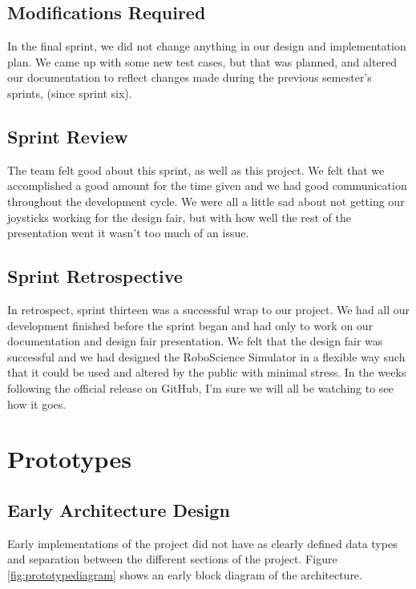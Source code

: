 \subsection{Modifications Required}
In the final sprint, we did not change anything in our design and implementation plan. We came up with some new test cases, but that was planned, and altered our documentation to reflect changes made during the previous semester's sprints, (since sprint six).

\subsection{Sprint Review}
The team felt good about this sprint, as well as this project. We felt that we accomplished a good amount for the time given and we had good communication throughout the development cycle. We were all a little sad about not getting our joysticks working for the design fair, but with how well the rest of the presentation went it wasn't too much of an issue.

\subsection{Sprint Retrospective}
In retrospect, sprint thirteen was a successful wrap to our project. We had all our development finished before the sprint began and had only to work on our documentation and design fair presentation. We felt that the design fair was successful and we had designed the RoboScience Simulator in a flexible way such that it could be used and altered by the public with minimal stress. In the weeks following the official release on GitHub, I'm sure we will all be watching to see how it goes.

\section{Prototypes}

\subsection{Early Architecture Design}
Early implementations of the project did not have as clearly defined data types and separation between the different sections of the project. Figure \ref{fig:prototypediagram} shows an early block diagram of the architecture. 


